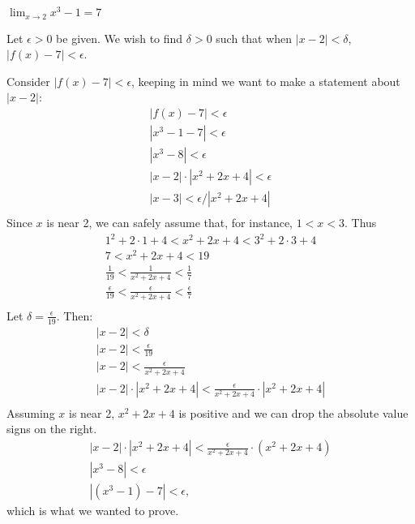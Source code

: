 {$\displaystyle \lim_{x\to 2} x^3-1 = 7$}
{Let $\epsilon >0$ be given. We wish to find $\delta >0$ such that when $|x-2|<\delta$, $|f(x)-7|<\epsilon$. 

Consider $|f(x)-7|<\epsilon$, keeping in  mind we want to make a statement about $|x-2|$:
\begin{gather*}
|f(x) -7 | < \epsilon \\
|x^3-1 -7 |<\epsilon \\
| x^3-8 | < \epsilon \\
| x-2 |\cdot|x^2+2x+4| < \epsilon \\
| x-3 | < \epsilon/|x^2+2x+4| \\
\end{gather*}
Since $x$ is near 2, we can safely assume that, for instance, $1<x<3$. Thus
\begin{gather*}
1^2+2\cdot1+4<x^2+2x+4<3^2+2\cdot3+4 \\
7 < x^2+2x+4 < 19 \\
\frac{1}{19} < \frac{1}{x^2+2x+4} < \frac{1}{7} \\
\frac{\epsilon}{19} < \frac{\epsilon}{x^2+2x+4} < \frac{\epsilon}{7} \\
\end{gather*}
Let $\delta =\frac{\epsilon}{19}$. Then:
\begin{gather*}
|x-2|<\delta \\
|x-2| < \frac{\epsilon}{19}\\
|x-2| < \frac{\epsilon}{x^2+2x+4}\\
|x-2|\cdot|x^2+2x+4| < \frac{\epsilon}{x^2+2x+4}\cdot|x^2+2x+4|\\
\end{gather*}
Assuming $x$ is near 2, $x^2+2x+4$ is positive and we can drop the absolute value signs on the right.
\begin{gather*}
|x-2|\cdot|x^2+2x+4| < \frac{\epsilon}{x^2+2x+4}\cdot(x^2+2x+4)\\
|x^3-8| < \epsilon\\
|(x^3-1) - 7| < \epsilon,
\end{gather*}
which is what we wanted to prove.
}



